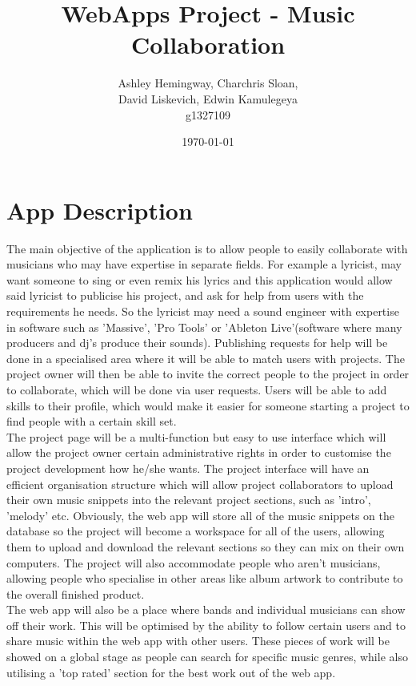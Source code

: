 \documentclass{article}
\title{WebApps Project - Music Collaboration}
\author{Ashley Hemingway, Charchris Sloan, \\ David Liskevich, Edwin Kamulegeya \\ g1327109}
\date{\today}
\begin{document}
\maketitle

\section{App Description}
The main objective of the application is to allow people to easily collaborate with musicians who may have expertise in separate fields. For example a lyricist, may want someone to sing or even remix his lyrics and this application would allow said lyricist to publicise his project, and ask for help from users with the requirements he needs. So the lyricist may need a sound engineer with expertise in software such as 'Massive', 'Pro Tools' or 'Ableton Live'(software where many producers and dj's produce their sounds). Publishing requests for help will be done in a specialised area where it will be able to match users with projects. The project owner will then be able to invite the correct people to the project in order to collaborate, which will be done via user requests. Users will be able to add skills to their profile, which would make it easier for someone starting a project to find people with a certain skill set. \\

\noindent The project page will be a multi-function but easy to use interface which will allow the project owner certain administrative rights in order to customise the project development how he/she wants. The project interface will have an efficient organisation structure which will allow project collaborators to upload their own music snippets into the relevant project sections, such as 'intro', 'melody' etc. Obviously, the web app will store all of the music snippets on the database so the project will become a workspace for all of the users, allowing them to upload and download the relevant sections so they can mix on their own computers. The project will also accommodate people who aren't musicians, allowing people who specialise in other areas like album artwork to contribute to the overall finished product. \\

\noindent The web app will also be a place where bands and individual musicians can show off their work. This will be optimised by the ability to follow certain users and to share music within the web app with other users. These pieces of work will be showed on a global stage as people can search for specific music genres, while also utilising a 'top rated' section for the best work out of the web app.
\end{document}
